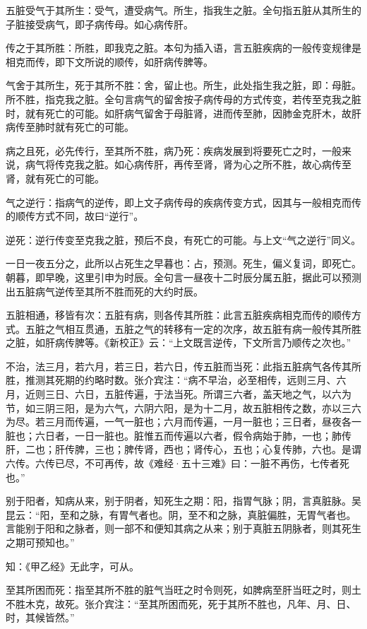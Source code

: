 \documentclass[draft,12pt]{ctexbook}
\begin{document}
\begin{jiaozhu}
  \item 五脏受气于其所生：受气，遭受病气。所生，指我生之脏。全句指五脏从其所生的子脏接受病气，即子病传母。如心病传肝。
  \item 传之于其所胜：所胜，即我克之脏。本句为插入语，言五脏疾病的一般传变规律是相克而传，即下文所说的顺传，如肝病传脾等。
  \item 气舍于其所生，死于其所不胜：舍，留止也。所生，此处指生我之脏，即：母脏。所不胜，指克我之脏。全句言病气的留舍按子病传母的方式传变，若传至克我之脏时，就有死亡的可能。如肝病气留舍于母脏肾，进而传至肺，因肺金克肝木，故肝病传至肺时就有死亡的可能。
  \item 病之且死，必先传行，至其所不胜，病乃死：疾病发展到将要死亡之时，一般来说，病气将传克我之脏。如心病传肝，再传至肾，肾为心之所不胜，故心病传至肾，就有死亡的可能。
  \item 气之逆行：指病气的逆传，即上文子病传母的疾病传变方式，因其与一般相克而传的顺传方式不同，故曰“逆行”。
  \item 逆死：逆行传变至克我之脏，预后不良，有死亡的可能。与上文“气之逆行”同义。
  \item 一日一夜五分之，此所以占死生之早暮也：占，预测。死生，偏义复词，即死亡。朝暮，即早晚，这里引申为时辰。全句言一昼夜十二时辰分属五脏，据此可以预测出五脏病气逆传至其所不胜而死的大约时辰。
  \item 五脏相通，移皆有次：五脏有病，则各传其所胜：此言五脏疾病相克而传的顺传方式。五脏之气相互贯通，五脏之气的转移有一定的次序，故五脏有病一般传其所胜之脏，如肝病传脾等。《新校正》云：“上文既言逆传，下文所言乃顺传之次也。”
  \item 不治，法三月，若六月，若三日，若六日，传五脏而当死：此指五脏病气各传其所胜，推测其死期的约略时数。张介宾注：“病不早治，必至相传，远则三月、六月，近则三日、六日，五脏传遍，于法当死。所谓三六者，盖天地之气，以六为节，如三阴三阳，是为六气，六阴六阳，是为十二月，故五脏相传之数，亦以三六为尽。若三月而传遍，一气一脏也；六月而传遍，一月一脏也；三日者，昼夜各一脏也；六日者，一日一脏也。脏惟五而传遍以六者，假令病始于肺，一也；肺传肝，二也；肝传脾，三也；脾传肾，西也；肾传心，五也；心复传肺，六也。是谓六传。六传已尽，不可再传，故《难经·五十三难》曰：一脏不再伤，七传者死也。”
  \item 别于阳者，知病从来，别于阴者，知死生之期：阳，指胃气脉；阴，言真脏脉。吴昆云：“阳，至和之脉，有胃气者也。阴，至不和之脉，真脏偏胜，无胃气者也。言能别于阳和之脉者，则一部不和便知其病之从来；别于真脏五阴脉者，则其死生之期可预知也。”
  \item 知：《甲乙经》无此字，可从。
  \item 至其所困而死：指至其所不胜的脏气当旺之时令则死，如脾病至肝当旺之时，则土不胜木克，故死。张介宾注：“至其所困而死，死于其所不胜也，凡年、月、日、时，其候皆然。”
\end{jiaozhu}
\end{document}
